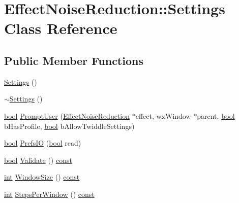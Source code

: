 \hypertarget{class_effect_noise_reduction_1_1_settings}{}\section{Effect\+Noise\+Reduction\+:\+:Settings Class Reference}
\label{class_effect_noise_reduction_1_1_settings}
\subsection*{Public Member Functions}
\begin{DoxyCompactItemize}
\item 
\hyperlink{class_effect_noise_reduction_1_1_settings_a775790f745b6722101619759d5476ebd}{Settings} ()
\item 
\hyperlink{class_effect_noise_reduction_1_1_settings_a123dabde958912258a3c62332e167211}{$\sim$\+Settings} ()
\item 
\hyperlink{mac_2config_2i386_2lib-src_2libsoxr_2soxr-config_8h_abb452686968e48b67397da5f97445f5b}{bool} \hyperlink{class_effect_noise_reduction_1_1_settings_a49bb03abdd30d833836478242ab9b57c}{Prompt\+User} (\hyperlink{class_effect_noise_reduction}{Effect\+Noise\+Reduction} $\ast$effect, wx\+Window $\ast$parent, \hyperlink{mac_2config_2i386_2lib-src_2libsoxr_2soxr-config_8h_abb452686968e48b67397da5f97445f5b}{bool} b\+Has\+Profile, \hyperlink{mac_2config_2i386_2lib-src_2libsoxr_2soxr-config_8h_abb452686968e48b67397da5f97445f5b}{bool} b\+Allow\+Twiddle\+Settings)
\item 
\hyperlink{mac_2config_2i386_2lib-src_2libsoxr_2soxr-config_8h_abb452686968e48b67397da5f97445f5b}{bool} \hyperlink{class_effect_noise_reduction_1_1_settings_a46d76d568fa2e89ead4b39bea59c04c4}{Prefs\+IO} (\hyperlink{mac_2config_2i386_2lib-src_2libsoxr_2soxr-config_8h_abb452686968e48b67397da5f97445f5b}{bool} read)
\item 
\hyperlink{mac_2config_2i386_2lib-src_2libsoxr_2soxr-config_8h_abb452686968e48b67397da5f97445f5b}{bool} \hyperlink{class_effect_noise_reduction_1_1_settings_a2876344879f8341f5176b1fdabdc0a4c}{Validate} () \hyperlink{getopt1_8c_a2c212835823e3c54a8ab6d95c652660e}{const} 
\item 
\hyperlink{xmltok_8h_a5a0d4a5641ce434f1d23533f2b2e6653}{int} \hyperlink{class_effect_noise_reduction_1_1_settings_a3d3a3d6e886e2db5d496fea164e49e81}{Window\+Size} () \hyperlink{getopt1_8c_a2c212835823e3c54a8ab6d95c652660e}{const} 
\item 
\hyperlink{xmltok_8h_a5a0d4a5641ce434f1d23533f2b2e6653}{int} \hyperlink{class_effect_noise_reduction_1_1_settings_ab6eda94ee9b1972ea8d68b8bc7e4253d}{Steps\+Per\+Window} () \hyperlink{getopt1_8c_a2c212835823e3c54a8ab6d95c652660e}{const} 
\end{DoxyCompactItemize}
